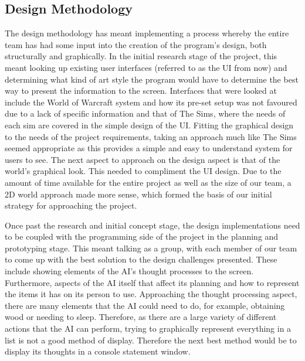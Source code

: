 \documentclass[a4paper]{report}
\begin{document}
\subsection{Design Methodology}
The design methodology has meant implementing a process whereby the entire team has had some input into the creation of the program’s design, both structurally and graphically. In the initial research stage of the project, this meant looking up existing user interfaces (referred to as the UI from now) and determining what kind of art style the program would have to determine the best way to present the information to the screen. Interfaces that were looked at include the World of Warcraft system and how its pre-set setup was not favoured due to a lack of specific information and that of The Sims, where the needs of each sim are covered in the simple design of the UI. Fitting the graphical design to the needs of the project requirements, taking an approach much like The Sims seemed appropriate as this provides a simple and easy to understand system for users to see. The next aspect to approach on the design aspect is that of the world’s graphical look. This needed to compliment the UI design. Due to the amount of time available for the entire project as well as the size of our team, a 2D world approach made more sense, which formed the basis of our initial strategy for approaching the project.

Once past the research and initial concept stage, the design implementations need to be coupled with the programming side of the project in the planning and prototyping stage. This meant talking as a group, with each member of our team to come up with the best solution to the design challenges presented. These include showing elements of the AI’s thought processes to the screen. Furthermore, aspects of the AI itself that affect its planning and how to represent the items it has on its person to use. Approaching the thought processing aspect, there are many elements that the AI could need to do, for example, obtaining wood or needing to sleep. Therefore, as there are a large variety of different actions that the AI can perform, trying to graphically represent everything in a list is not a good method of display. Therefore the next best method would be to display its thoughts in a console statement window.
\end{document}
